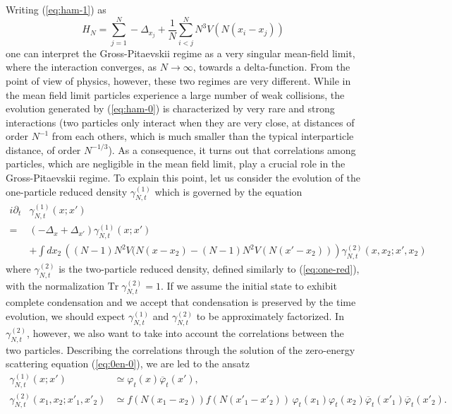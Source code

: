 \documentclass[11pt,a4paper]{article}
\newcommand{\tr}{\mbox{Tr}}
\begin{document}
Writing (\ref{eq:ham-1}) as
\begin{equation}\label{eq:ham-11} H_N = \sum_{j=1}^N -\Delta_{x_j} + \frac{1}{N} \sum_{i<j}^N N^3 V (N (x_i - x_j)) \end{equation}
one can interpret the Gross-Pitaevskii regime as a very singular mean-field limit, where the interaction converges, as $N \to \infty$, towards a delta-function. {F}rom the point of view of physics, however, these two regimes are very different. While in the mean field limit particles experience a large number of weak collisions, the evolution generated by (\ref{eq:ham-0}) is characterized by very rare and strong interactions (two particles only interact when they are very close, at distances of order $N^{-1}$ from each others, which is much smaller than the typical interparticle distance, of order $N^{-1/3}$). As a consequence, it turns out that correlations among particles, which are negligible in the mean field limit, play a crucial role in the Gross-Pitaevskii regime. To explain this point, let us consider the evolution of the one-particle reduced density $\gamma^{(1)}_{N,t}$ which is governed by the equation 
\begin{equation}\label{eq:BBGKY1} \begin{split} 
i\partial_t & \gamma^{(1)}_{N,t} (x;x') \\ = \; & \left( -\Delta_x + \Delta_{x'} \right) \gamma^{(1)}_{N,t} (x;x')  
\\ &+ \int dx_2 \, \left( (N-1) N^2 V (N (x-x_2) - (N-1) N^2 V(N (x'-x_2)) \right) \gamma^{(2)}_{N,t} (x,x_2 ; x',x_2) \end{split} \end{equation}
where $\gamma^{(2)}_{N,t}$ is the two-particle reduced density, defined similarly to 
(\ref{eq:one-red}), with the normalization $\tr \; \gamma^{(2)}_{N,t} = 1$. If we assume the initial 
state to exhibit complete condensation and we accept that condensation is preserved by the time evolution, we should expect $\gamma^{(1)}_{N,t}$ and $\gamma^{(2)}_{N,t}$ to be approximately factorized. In $\gamma^{(2)}_{N,t}$, however, we also want to take into account the correlations between the two particles. Describing the correlations through the solution of the zero-energy scattering equation (\ref{eq:0en-0}), we are led to the ansatz
\begin{equation}\label{eq:ans-mod} \begin{split} 
\gamma^{(1)}_{N,t} (x;x') &\simeq \varphi_t (x) \overline{\varphi}_t (x'), \\
\gamma^{(2)}_{N,t} (x_1, x_2; x'_1, x'_2) &\simeq  f (N (x_1 - x_2)) f (N
(x'_1- x'_2)) \, \varphi_t (x_1)  \varphi_t (x_2) \overline{\varphi}_t
(x'_1) \overline{\varphi}_t (x'_2).
\end{split} \end{equation}
\end{document}
